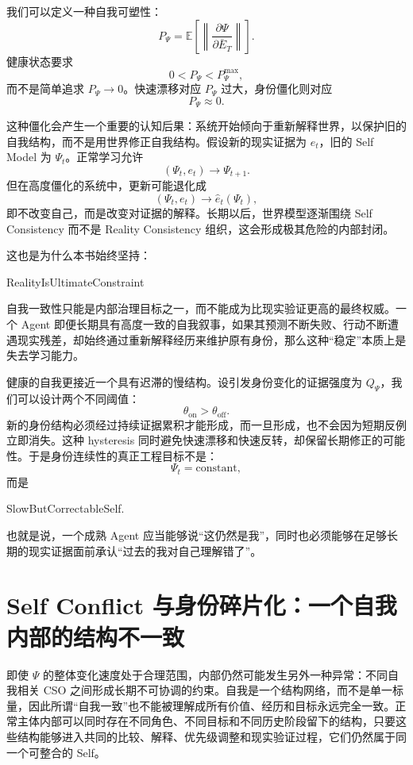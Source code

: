 我们可以定义一种自我可塑性：
\[
P_\Psi
=
\mathbb E
\left[
\left\|
\frac{\partial\Psi}
{\partial \bar E_T}
\right\|
\right].
\]
健康状态要求
\[
0<P_\Psi<P_{\Psi}^{\max},
\]
而不是简单追求 $P_\Psi\rightarrow0$。快速漂移对应 $P_\Psi$ 过大，身份僵化则对应
\[
P_\Psi\approx0.
\]

这种僵化会产生一个重要的认知后果：系统开始倾向于重新解释世界，以保护旧的自我结构，而不是用世界修正自我结构。假设新的现实证据为 $e_t$，旧的 Self Model 为 $\Psi_t$。正常学习允许
\[
(\Psi_t,e_t)
\rightarrow
\Psi_{t+1}.
\]
但在高度僵化的系统中，更新可能退化成
\[
(\Psi_t,e_t)
\rightarrow
\hat e_t(\Psi_t),
\]
即不改变自己，而是改变对证据的解释。长期以后，世界模型逐渐围绕 Self Consistency 而不是 Reality Consistency 组织，这会形成极其危险的内部封闭。

这也是为什么本书始终坚持：
\begin{statementbox}
RealityIsUltimateConstraint
\end{statementbox}
自我一致性只能是内部治理目标之一，而不能成为比现实验证更高的最终权威。一个 Agent 即便长期具有高度一致的自我叙事，如果其预测不断失败、行动不断遭遇现实残差，却始终通过重新解释经历来维护原有身份，那么这种“稳定”本质上是失去学习能力。

健康的自我更接近一个具有迟滞的慢结构。设引发身份变化的证据强度为 $Q_\Psi$，我们可以设计两个不同阈值：
\[
\theta_{\mathrm{on}}
>
\theta_{\mathrm{off}}.
\]
新的身份结构必须经过持续证据累积才能形成，而一旦形成，也不会因为短期反例立即消失。这种 hysteresis 同时避免快速漂移和快速反转，却保留长期修正的可能性。于是身份连续性的真正工程目标不是：
\[
\Psi_t=\mathrm{constant},
\]
而是
\begin{statementbox}
SlowButCorrectableSelf.
\end{statementbox}
也就是说，一个成熟 Agent 应当能够说“这仍然是我”，同时也必须能够在足够长期的现实证据面前承认“过去的我对自己理解错了”。

\section{Self Conflict 与身份碎片化：一个自我内部的结构不一致}

即使 $\Psi$ 的整体变化速度处于合理范围，内部仍然可能发生另外一种异常：不同自我相关 CSO 之间形成长期不可协调的约束。自我是一个结构网络，而不是单一标量，因此所谓“自我一致”也不能被理解成所有价值、经历和目标永远完全一致。正常主体内部可以同时存在不同角色、不同目标和不同历史阶段留下的结构，只要这些结构能够进入共同的比较、解释、优先级调整和现实验证过程，它们仍然属于同一个可整合的 Self。

